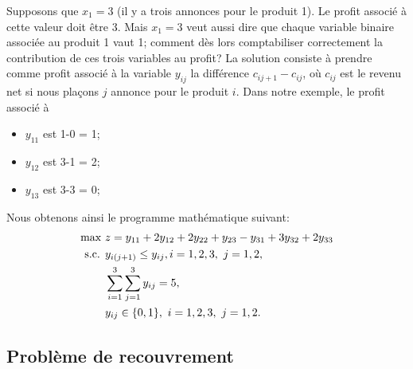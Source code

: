 \begin{example}
Supposons que $x_1 = 3$ (il y a trois annonces pour le produit 1).
Le profit associé à cette valeur doit être 3.
Mais $x_1 = 3$ veut aussi dire que chaque variable binaire associée au produit 1 vaut 1;
comment dès lors comptabiliser correctement la contribution de ces trois variables au profit?
La solution consiste à prendre comme profit associé à la variable $y_{ij}$ la différence $c_{i{j+1}}-c_{ij}$, où $c_{ij}$ est le revenu net si nous plaçons $j$ annonce pour le produit $i$.
Dans notre exemple, le profit associé à
\begin{itemize}
\item
$y_{11}$ est 1-0 = 1;
\item
$y_{12}$ est 3-1 = 2;
\item
$y_{13}$ est 3-3 = 0;
\end{itemize}
Nous obtenons ainsi le programme mathématique suivant:
\begin{align*}
\max\ & z = y_{11} + 2y_{12} + 2y_{22} + y_{23} - y_{31} +3 y_{32} +2 y_{33}\\
\mbox{s.c. } & y_{i(j+1)} \leq y_{ij}, i = 1,2,3,\ j=1,2,\\
& \sum_{i = 1}^3 \sum_{j = 1}^3 y_{ij} = 5, \\
& y_{ij} \in \lbrace 0,1 \rbrace,\ i = 1,2,3,\ j=1,2.
\end{align*}
\end{example}

\subsection{Problème de recouvrement}


